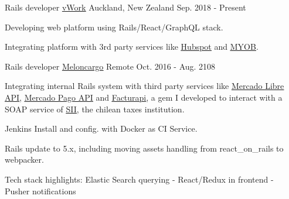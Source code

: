 
\begin{cventries}

  \cventry
    {Rails developer} %
    {\href{http://www.vworkapp.com/}{\underline{vWork}}} %
    {Auckland, New Zealand} %
    {Sep. 2018 - Present} %
    {
      \begin{cvitems} %
        \item { Developing web platform using Rails/React/GraphQL stack. }
        \item { Integrating platform with 3rd party services like
                \href{https://www.hubspot.com/}{\underline{Hubspot}} and
                \href{https://www.myob.com}{\underline{MYOB}}. }
      \end{cvitems}
    }

  \cventry
    {Rails developer} %
    {\href{http://www.meloncargo.com/}{\underline{Meloncargo}}} %
    {Remote} %
    {Oct. 2016 - Aug. 2108} %
    {
      \begin{cvitems} %
        \item { Integrating internal Rails system with third party services like
                \href{http://developers.mercadolibre.com/}{\underline{Mercado Libre API}},
                \href{https://www.mercadopago.com.br/developers/es/api-docs/}{\underline{Mercado Pago API}}
                and \href{https://github.com/alagos/facturapi}{\underline{Facturapi}},
                a gem I developed to interact with a SOAP service of \href{http://www.sii.cl}{\underline{SII}},
                the chilean taxes institution. }
        \item { Jenkins Install and config. with Docker as CI Service. }
        \item { Rails update to 5.x, including moving assets handling from react\_on\_rails to webpacker. }
        \item { Tech stack highlights: Elastic Search querying - React/Redux in frontend - Pusher notifications }
      \end{cvitems}
    }


\end{cventries}
